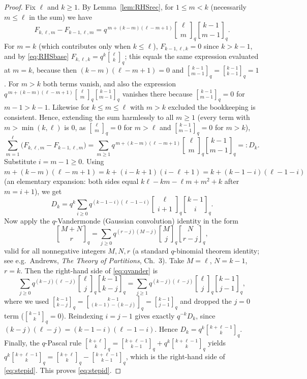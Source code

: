 \documentclass{amsart}
\theoremstyle{definition}
\newcommand{\qbin}[2]{\genfrac{[}{]}{0pt}{}{#1}{#2}_q}
\begin{document}
\begin{proof}
Fix $\ell$ and $k\ge1$. By Lemma~\ref{lem:RHSrec}, for $1\le m<k$ (necessarily
$m\le\ell$ in the sum) we have
\[
F_{k,\ell,m}-F_{k-1,\ell,m}=q^{\,m+(k-m)(\ell-m+1)}\qbin{\ell}{m}\qbin{k-1}{m-1}.
\]
For $m=k$ (which contributes only when $k\le\ell$), $F_{k-1,\ell,k}=0$ since $k>k-1$,
and by \eqref{eq:RHSbase} $F_{k,\ell,k}=q^{k}\qbin{\ell}{k}$; this equals the same
expression evaluated at $m=k$, because then $(k-m)(\ell-m+1)=0$ and
$\qbin{k-1}{m-1}=\qbin{k-1}{k-1}=1$. For $m>k$ both terms vanish, and also the
expression $q^{\,m+(k-m)(\ell-m+1)}\qbin{\ell}{m}\qbin{k-1}{m-1}$ vanishes there
because $\qbin{k-1}{m-1}=0$ for $m-1>k-1$. Likewise for $k\le m\le\ell$ with
$m>k$ excluded the bookkeeping is consistent. Hence, extending the sum harmlessly
to all $m\ge1$ (every term with $m>\min(k,\ell)$ is $0$, as $\qbin{\ell}{m}=0$ for
$m>\ell$ and $\qbin{k-1}{m-1}=0$ for $m>k$),
\begin{equation}\label{eq:Dunified}
\sum_{m=1}^{\ell}\big(F_{k,\ell,m}-F_{k-1,\ell,m}\big)
=\sum_{m\ge1}q^{\,m+(k-m)(\ell-m+1)}\qbin{\ell}{m}\qbin{k-1}{m-1}=:D_k.
\end{equation}
Substitute $i=m-1\ge0$. Using
$m+(k-m)(\ell-m+1)=k+(i-k+1)(i-\ell+1)=k+(k-1-i)(\ell-1-i)$ (an elementary
expansion: both sides equal $k\ell-k m-\ell m+m^2+k$ after $m=i+1$), we get
\[
D_k=q^{k}\sum_{i\ge0}q^{(k-1-i)(\ell-1-i)}\qbin{\ell}{i+1}\qbin{k-1}{i}.
\]
Now apply the $q$-Vandermonde (Gaussian convolution) identity in the form
\begin{equation}\label{eq:qvander}
\qbin{M+N}{r}=\sum_{j\ge0}q^{(r-j)(M-j)}\qbin{M}{j}\qbin{N}{r-j},
\end{equation}
valid for all nonnegative integers $M,N,r$ (a standard $q$-binomial theorem
identity; see e.g.\ Andrews, \emph{The Theory of Partitions}, Ch.~3). Take
$M=\ell$, $N=k-1$, $r=k$. Then the right-hand side of \eqref{eq:qvander} is
\[
\sum_{j\ge0}q^{(k-j)(\ell-j)}\qbin{\ell}{j}\qbin{k-1}{k-j}
=\sum_{j\ge1}q^{(k-j)(\ell-j)}\qbin{\ell}{j}\qbin{k-1}{j-1},
\]
where we used $\qbin{k-1}{k-j}=\qbin{k-1}{(k-1)-(k-j)}=\qbin{k-1}{j-1}$ and dropped
the $j=0$ term ($\qbin{k-1}{k}=0$). Reindexing $i=j-1$ gives exactly
$q^{-k}D_k$, since $(k-j)(\ell-j)=(k-1-i)(\ell-1-i)$. Hence
$D_k=q^{k}\qbin{k+\ell-1}{k}$. Finally, the $q$-Pascal rule
$\qbin{k+\ell}{k}=\qbin{k+\ell-1}{k-1}+q^{k}\qbin{k+\ell-1}{k}$ yields
$q^{k}\qbin{k+\ell-1}{k}=\qbin{k+\ell}{k}-\qbin{k+\ell-1}{k-1}$, which is the
right-hand side of \eqref{eq:stepid}. This proves \eqref{eq:stepid}.
\end{proof}
\end{document}
